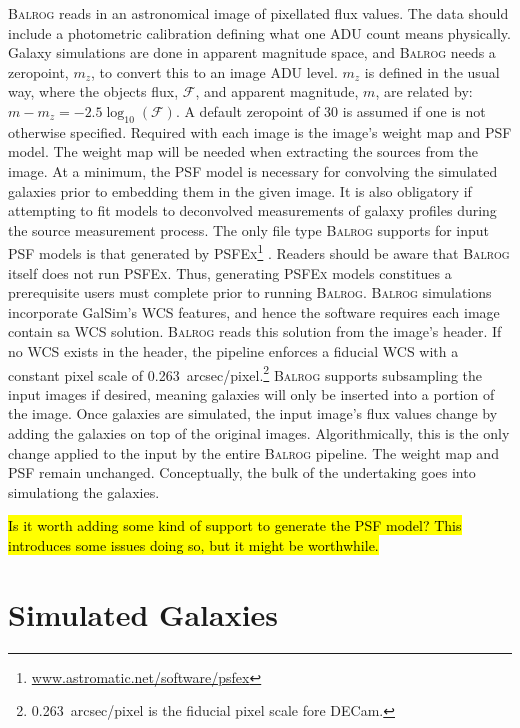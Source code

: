 \documentclass[12pt]{book}
\newcommand{\galsim}{GalSim}
\newcommand{\balrog}{\textsc{Balrog}}
\newcommand{\psfex}{\textsc{PSFEx}}
\begin{document}
\balrog{} reads in an astronomical image of pixellated flux values.
The data should include a photometric calibration defining
what one ADU count means physically. 
Galaxy simulations are done in apparent magnitude space,
and \balrog{} needs a zeropoint, $m_z$, to convert this to an image ADU level.
$m_z$ is defined in the usual way, where the objects flux, $\mathcal{F}$,
and apparent magnitude, $m$, are related by:
$m - m_ z = -2.5 \log_{10}(\mathcal{F})$.
A default zeropoint of 30 is assumed if one is not otherwise specified.
Required with each image is the image's weight map and PSF model. 
The weight map will be needed when extracting the sources from the image.
At a minimum, the PSF model is necessary for convolving the simulated galaxies
prior to  embedding them in the given image.
It is also obligatory if attempting to fit models to deconvolved measurements of galaxy profiles
during the source measurement process.
The only file type \balrog{} supports for input PSF models is that generated by 
\psfex{}\footnote{\url{www.astromatic.net/software/psfex}} \citep{psfex}.
Readers should be aware that \balrog{} itself does not run \psfex{}.
Thus, generating \psfex{} models constitues a prerequisite users must complete prior to running \balrog{}.
\balrog{} simulations incorporate \galsim{}'s WCS features, and hence
the software requires each image contain sa WCS solution. \balrog{} reads this solution from the image's header.
If no WCS exists in the header, the pipeline enforces a fiducial WCS with a constant pixel scale of 
0.263~arcsec/pixel.\footnote{0.263~arcsec/pixel is the fiducial pixel scale fore DECam.}
\balrog{} supports subsampling the input images if desired, meaning galaxies will only be
inserted into a portion of the image.
Once galaxies are simulated, the input image's flux values change by adding the galaxies on top of the original images. 
Algorithmically, this is the only change applied to the input by the entire \balrog{} pipeline.
The weight map and PSF remain unchanged.
Conceptually, the bulk of the undertaking goes into simulationg the galaxies.

\hl{Is it worth adding some kind of support to generate the PSF model? This introduces some issues doing so, but it might be worthwhile.}

\section{Simulated Galaxies}
\label{sec:galsim}
\end{document}
